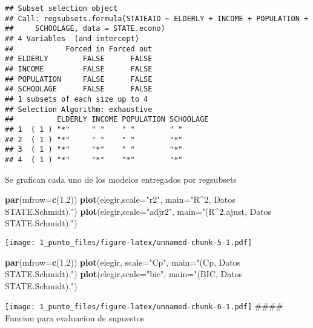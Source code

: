 \documentclass[
]{article}
\newenvironment{Shaded}{\begin{snugshade}}{\end{snugshade}}
\newcommand{\DataTypeTok}[1]{\textcolor[rgb]{0.13,0.29,0.53}{#1}}
\newcommand{\DecValTok}[1]{\textcolor[rgb]{0.00,0.00,0.81}{#1}}
\newcommand{\KeywordTok}[1]{\textcolor[rgb]{0.13,0.29,0.53}{\textbf{#1}}}
\newcommand{\NormalTok}[1]{#1}
\newcommand{\StringTok}[1]{\textcolor[rgb]{0.31,0.60,0.02}{#1}}
\begin{document}
\begin{verbatim}
## Subset selection object
## Call: regsubsets.formula(STATEAID ~ ELDERLY + INCOME + POPULATION + 
##     SCHOOLAGE, data = STATE.econo)
## 4 Variables  (and intercept)
##            Forced in Forced out
## ELDERLY        FALSE      FALSE
## INCOME         FALSE      FALSE
## POPULATION     FALSE      FALSE
## SCHOOLAGE      FALSE      FALSE
## 1 subsets of each size up to 4
## Selection Algorithm: exhaustive
##          ELDERLY INCOME POPULATION SCHOOLAGE
## 1  ( 1 ) "*"     " "    " "        " "      
## 2  ( 1 ) "*"     " "    " "        "*"      
## 3  ( 1 ) "*"     "*"    " "        "*"      
## 4  ( 1 ) "*"     "*"    "*"        "*"
\end{verbatim}

Se grafican cada uno de los modelos entregados por regsubsets

\begin{Shaded}
\begin{Highlighting}[]
\KeywordTok{par}\NormalTok{(}\DataTypeTok{mfrow=}\KeywordTok{c}\NormalTok{(}\DecValTok{1}\NormalTok{,}\DecValTok{2}\NormalTok{))}
\KeywordTok{plot}\NormalTok{(elegir,}\DataTypeTok{scale=}\StringTok{"r2"}\NormalTok{, }\DataTypeTok{main=}\StringTok{"R^2, Datos STATE.Schmidt)."}\NormalTok{)}
\KeywordTok{plot}\NormalTok{(elegir,}\DataTypeTok{scale=}\StringTok{"adjr2"}\NormalTok{, }\DataTypeTok{main=}\StringTok{"(R^2.ajust, Datos STATE.Schmidt)."}\NormalTok{)}
\end{Highlighting}
\end{Shaded}

\texttt{[image: 1\_punto\_files/figure-latex/unnamed-chunk-5-1.pdf]}

\begin{Shaded}
\begin{Highlighting}[]
\KeywordTok{par}\NormalTok{(}\DataTypeTok{mfrow=}\KeywordTok{c}\NormalTok{(}\DecValTok{1}\NormalTok{,}\DecValTok{2}\NormalTok{))}
\KeywordTok{plot}\NormalTok{(elegir, }\DataTypeTok{scale=}\StringTok{"Cp"}\NormalTok{, }\DataTypeTok{main=}\StringTok{"(Cp, Datos STATE.Schmidt)."}\NormalTok{)}
\KeywordTok{plot}\NormalTok{(elegir,}\DataTypeTok{scale=}\StringTok{"bic"}\NormalTok{, }\DataTypeTok{main=}\StringTok{"(BIC, Datos STATE.Schmidt)."}\NormalTok{)}
\end{Highlighting}
\end{Shaded}

\texttt{[image: 1\_punto\_files/figure-latex/unnamed-chunk-6-1.pdf]}
\#\#\#\# Funcion para evaluacion de supuestos
\end{document}
